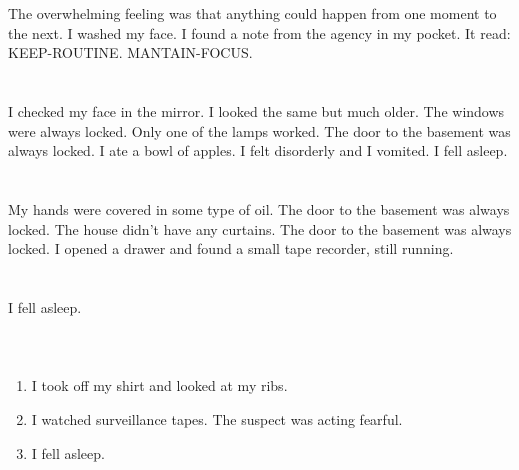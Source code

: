 \documentclass{article}
\begin{document}
    \section{}
    The overwhelming feeling was that anything could happen from one moment to the next. I washed my face. I found a note from the agency in my pocket. It read: KEEP-ROUTINE. MANTAIN-FOCUS.  
    \newpage
    
    \section{}
    I checked my face in the mirror. I looked the same but much older. The windows were always locked. Only one of the lamps worked. The door to the basement was always locked. I ate a bowl of apples. I felt disorderly and I vomited. I fell asleep.  
    \newpage
    
    \section{}
    My hands were covered in some type of oil. The door to the basement was always locked. The house didn't have any curtains. The door to the basement was always locked. I opened a drawer and found a small tape recorder, still running.  
    \newpage
    
    \section{}
    I fell asleep.\\\\ 
    \newpage
    
    \section{}
    
    \begin{enumerate}
    
    \item I took off my shirt and looked at my ribs.\\
    
    \item I watched surveillance tapes. The suspect was acting fearful.\\
    
    \item I fell asleep.\\
    
    \end{enumerate}
     
\end{document}
